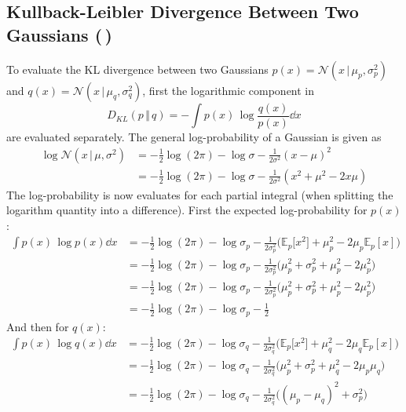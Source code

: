 \documentclass[11pt, a4paper]{scrartcl}
\newcommand{\E}{\mathbb{E}}
\newcommand{\KL}{D_\mathit{KL}}
\newcommand{\given}{\,\vert\,}
\newcommand{\diffstar}{\texorpdfstring{\raisebox{-1pt}{\resizebox{!}{8pt}{\(\star\)}}}{*}}
\newcommand{\twostar}  {(\diffstar\,\diffstar)}
\begin{document}
		\subsection{Kullback-Leibler Divergence Between Two Gaussians  \twostar}
			To evaluate the KL divergence between two Gaussians \( p(x) = \mathcal{N}(x \given \mu_p, \sigma_p^2) \) and \( q(x) = \mathcal{N}(x \given \mu_q, \sigma_q^2) \), first the logarithmic component in
			\begin{equation}
				\KL(p \,\Vert\, q) = -\int\! p(x) \, \log \frac{q(x)}{p(x)} \dd{x}  \label{eq:1-31-kl}
			\end{equation}
			are evaluated separately. The general log-probability of a Gaussian is given as
			\begin{align}
				\log \mathcal{N}(x \given \mu, \sigma^2)
					&= -\frac{1}{2} \log(2\pi) - \log\sigma - \frac{1}{2 \sigma^2} (x - \mu)^2 \\
					&= -\frac{1}{2} \log(2\pi) - \log\sigma - \frac{1}{2 \sigma^2} (x^2 + \mu^2 - 2 x \mu)
			\end{align}
			The log-probability is now evaluates for each partial integral (when splitting the logarithm quantity into a difference). First the expected log-probability for \(p(x)\):
			\begin{align}
				\int\! p(x) \, \log p(x) \dd{x}
					&= -\frac{1}{2} \log(2\pi) - \log\sigma_p - \frac{1}{2 \sigma_p^2} \Big( \E_p\big[x^2\big] + \mu_p^2 - 2 \mu_p \E_p[x] \Big) \\
					&= -\frac{1}{2} \log(2\pi) - \log\sigma_p - \frac{1}{2 \sigma_p^2} \Big( \mu_p^2 + \sigma_p^2 + \mu_p^2 - 2 \mu_p^2 \Big) \\
					&= -\frac{1}{2} \log(2\pi) - \log\sigma_p - \frac{1}{2 \sigma_p^2} \Big( \mu_p^2 + \sigma_p^2 + \mu_p^2 - 2 \mu_p^2 \Big) \\
					&= -\frac{1}{2} \log(2\pi) - \log\sigma_p - \frac{1}{2}
			\end{align}
			And then for \(q(x)\):
			\begin{align}
				\int\! p(x) \, \log q(x) \dd{x}
					&= -\frac{1}{2} \log(2\pi) - \log\sigma_q - \frac{1}{2 \sigma_q^2} \Big( \E_p\big[x^2\big] + \mu_q^2 - 2 \mu_q \E_p[x] \Big) \\
					&= -\frac{1}{2} \log(2\pi) - \log\sigma_q - \frac{1}{2 \sigma_q^2} \Big( \mu_p^2 + \sigma_p^2 + \mu_q^2 - 2 \mu_p \mu_q \Big) \\
					&= -\frac{1}{2} \log(2\pi) - \log\sigma_q - \frac{1}{2 \sigma_q^2} \Big( (\mu_p - \mu_q)^2 + \sigma_p^2 \Big)
			\end{align}
\end{document}
